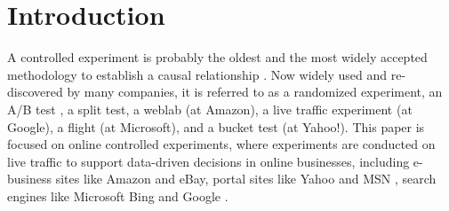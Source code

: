 \documentclass{sig-alternate}
\begin{document}




\section{Introduction}\label{sec:intro}

A controlled experiment is probably the oldest and the most widely accepted methodology to establish a causal relationship \citep{Mason,Box,Keppel,expsurvey,Manzi}.  Now widely used and re-discovered by many companies, it is referred to as a randomized experiment, an A/B test \citep{wikipediaABTest}, a split test, a weblab (at Amazon), a live traffic experiment (at Google), a flight (at Microsoft), and a bucket test (at Yahoo!).
This paper is focused on online controlled experiments, where experiments are conducted on live traffic to support data-driven decisions in online businesses, including e-business sites like Amazon and eBay, portal sites like Yahoo and MSN \citep{expsurvey}, search engines like Microsoft Bing \citep{puzzlingOutcomes} and Google \citep{googlesurvey}. 
\end{document}
